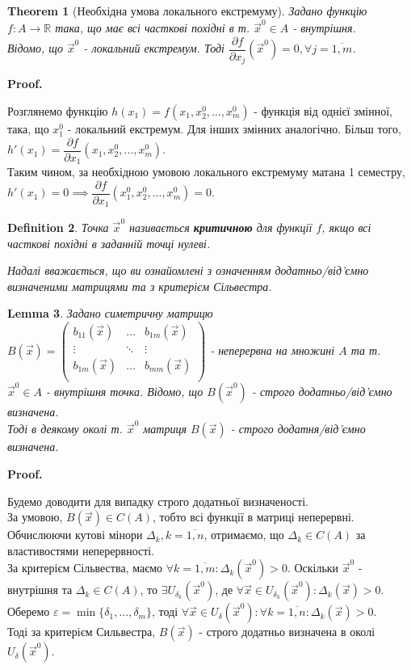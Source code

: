 \documentclass[a4paper, 10pt]{article}
\makeatletter
\def\departial#1#2{\dfrac{\partial {#1}}{\partial {#2}}}
\def\qed{$\blacksquare$}
\theoremstyle{theoremdd}
\newtheorem{theorem}{Theorem}[subsection]
\theoremstyle{theoremdd}
\newtheorem{definition}[theorem]{Definition}
\theoremstyle{theoremdd}
\theoremstyle{theoremdd}
\theoremstyle{theoremdd}
\theoremstyle{theoremdd}
\theoremstyle{theoremdd}
\newtheorem{lemma}[theorem]{Lemma}
\theoremstyle{theoremdd}
\renewenvironment{proof}[1][Proof.\\]{\par
\pushQED{\hfill \qed}%
\normalfont \topsep6\p@\@plus6\p@\relax
\trivlist
\item\relax
{\bfseries
#1\@addpunct{.}}\hspace\labelsep\ignorespaces
}{%
\popQED\endtrivlist\@endpefalse
}
\makeatother
\begin{document}
\begin{theorem}[Необхідна умова локального екстремуму]
Задано функцію $f: A \to \mathbb{R}$ така, що має всі часткові похідні в т. $\vec{x}^0 \in A$ - внутрішня.\\
Відомо, що $\vec{x}^0$ - локальний екстремум. Тоді $\departial{f}{x_j}(\vec{x}^0) = 0, \forall j=\overline{1,m}$.
\end{theorem}

\begin{proof}
Розглянемо функцію $h(x_1) = f(x_1,x_2^0,\dots,x_m^0)$ - функція від однієї змінної, така, що $x_1^0$ - локальний екстремум. Для інших змінних аналогічно. Більш того, $h'(x_1) = \departial{f}{x_1}(x_1,x_2^0,\dots,x_m^0)$.\\
Таким чином, за необхідною умовою локального екстремуму матана 1 семестру, \\ $h'(x_1) = 0 \implies \departial{f}{x_1}(x_1^0,x_2^0,\dots,x_m^0) = 0$.
\end{proof}

\begin{definition}
Точка $\vec{x}^0$ називається \textbf{критичною} для функції $f$, якщо всі часткові похідні в заданній точці нулеві.
\end{definition}

\textit{Надалі вважається, що ви ознайомлені з означенням додатньо/від'ємно визначеними матрицями та з критерієм Сільвестра.}

\begin{lemma}
Задано симетричну матрицю $B(\vec{x}) = \begin{pmatrix}
b_{11}(\vec{x}) & \dots & b_{1m}(\vec{x}) \\
\vdots & \ddots & \vdots \\
b_{1m}(\vec{x}) & \dots & b_{mm}(\vec{x}) \\
\end{pmatrix}$ - неперервна на множині $A$ та т. $\vec{x}^0 \in A$ - внутрішня точка. Відомо, що $B(\vec{x}^0)$ - строго додатньо/від'ємно визначена. \\ Тоді в деякому околі т. $\vec{x}^0$ матриця $B(\vec{x})$ - строго додатня/від'ємно визначена.
\end{lemma}

\begin{proof}
Будемо доводити для випадку строго додатньої визначеності.\\
За умовою, $B(\vec{x}) \in C(A)$, тобто всі функції в матриці неперервні. Обчислюючи кутові мінори $\Delta_k, k = \overline{1,n}$, отримаємо, що $\Delta_k \in C(A)$ за властивостями неперервності.\\
За критерієм Сільвества, маємо $\forall k = \overline{1,m}: \Delta_k (\vec{x}^0) > 0$. Оскільки $\vec{x}^0$ - внутрішня та $\Delta_k \in C(A)$, то $\exists U_{\delta_k}(\vec{x}^0)$, де $\forall \vec{x} \in U_{\delta_k}(\vec{x}^0): \Delta_k(\vec{x}) > 0$.\\
Оберемо $\varepsilon = \min \{\delta_1, \dots, \delta_m \}$, тоді $\forall \vec{x} \in U_{\delta}(\vec{x}^0): \forall k = \overline{1,n}: \Delta_k(\vec{x}) > 0$.\\
Тоді за критерієм Сильвестра, $B(\vec{x})$ - строго додатньо визначена в околі $U_\delta (\vec{x}^0)$.
\end{proof}
\end{document}

